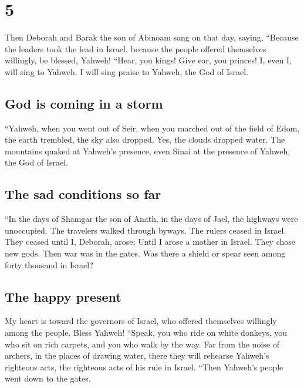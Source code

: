 \hypertarget{section-4}{%
\section{5}\label{section-4}}

 Then Deborah and Barak the son of Abinoam sang on that
day, saying,  ``Because the leaders took the lead in
Israel, because the people offered themselves willingly, be blessed,
Yahweh!  ``Hear, you kings! Give ear, you princes! I, even
I, will sing to Yahweh. I will sing praise to Yahweh, the God of Israel.

\hypertarget{god-is-coming-in-a-storm}{%
\subsection{God is coming in a storm}\label{god-is-coming-in-a-storm}}

 ``Yahweh, when you went out of Seir, when you marched out
of the field of Edom, the earth trembled, the sky also dropped. Yes, the
clouds dropped water.  The mountains quaked at Yahweh's
presence, even Sinai at the presence of Yahweh, the God of Israel.

\hypertarget{the-sad-conditions-so-far}{%
\subsection{The sad conditions so far}\label{the-sad-conditions-so-far}}

 ``In the days of Shamgar the son of Anath, in the days of
Jael, the highways were unoccupied. The travelers walked through byways.
 The rulers ceased in Israel. They ceased until I,
Deborah, arose; Until I arose a mother in Israel.  They
chose new gods. Then war was in the gates. Was there a shield or spear
seen among forty thousand in Israel?

\hypertarget{the-happy-present}{%
\subsection{The happy present}\label{the-happy-present}}

 My heart is toward the governors of Israel, who offered
themselves willingly among the people. Bless Yahweh! 
``Speak, you who ride on white donkeys, you who sit on rich carpets, and
you who walk by the way.  Far from the noise of archers,
in the places of drawing water, there they will rehearse Yahweh's
righteous acts, the righteous acts of his rule in Israel. ``Then
Yahweh's people went down to the gates.

